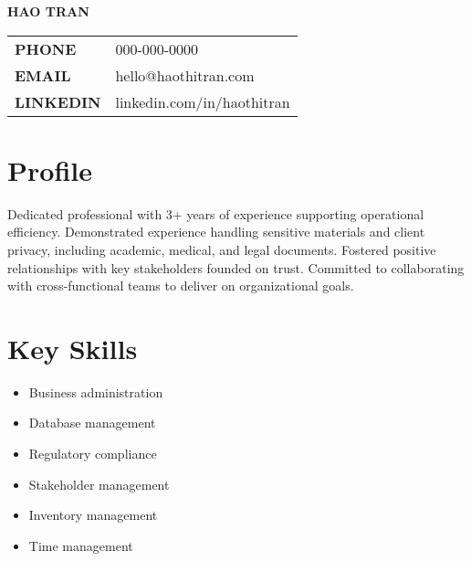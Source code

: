 \documentclass[letterpaper, 12pt]{article}
\newcommand{\resumeSectionDivider}{{\color{dark-grey}\hrulefill}}
\newcommand{\resumeItemListStart}{\begin{itemize}[leftmargin=0.2in,nosep,label={--}]}
\newcommand{\resumeItem}[1]{\item{\small \color{dark-grey} #1}}
\newcommand{\resumeItemListEnd}{\end{itemize}}
\begin{document}

\begin{center}
  \textbf{\huge HAO TRAN}\\ 
  \vspace{12pt}
\end{center}


\begin{tabular*}{\textwidth}{@{}ll@{\extracolsep{\fill}}}
  \textbf{PHONE} & \color{dark-grey} 000-000-0000 \\
  \textbf{EMAIL} & \color{dark-grey} hello@haothitran.com \\ 
  \textbf{LINKEDIN} & \color{dark-grey} linkedin.com/in/haothitran \\ 
\end{tabular*}

\vspace{12pt}
\resumeSectionDivider
\vspace{12pt}


\begin{minipage}[t]{0.64\textwidth}
  \section{Profile}\vspace{0pt}
  \raggedright \small \color{dark-grey} Dedicated professional with 3+ years of experience supporting operational efficiency. Demonstrated experience handling sensitive materials and client privacy, including academic, medical, and legal documents. Fostered positive relationships with key stakeholders founded on trust. Committed to collaborating with cross-functional teams to deliver on organizational goals.
\end{minipage}%
\hspace{0.25in}
\begin{minipage}[t]{0.3\textwidth}
  \section{Key Skills}\vspace{0pt}
  \resumeItemListStart
    \resumeItem {Business administration}
    \resumeItem {Database management}
    \resumeItem {Regulatory compliance}
    \resumeItem {Stakeholder management}
    \resumeItem {Inventory management}
    \resumeItem {Time management}
  \resumeItemListEnd
\end{minipage}
\end{document}
